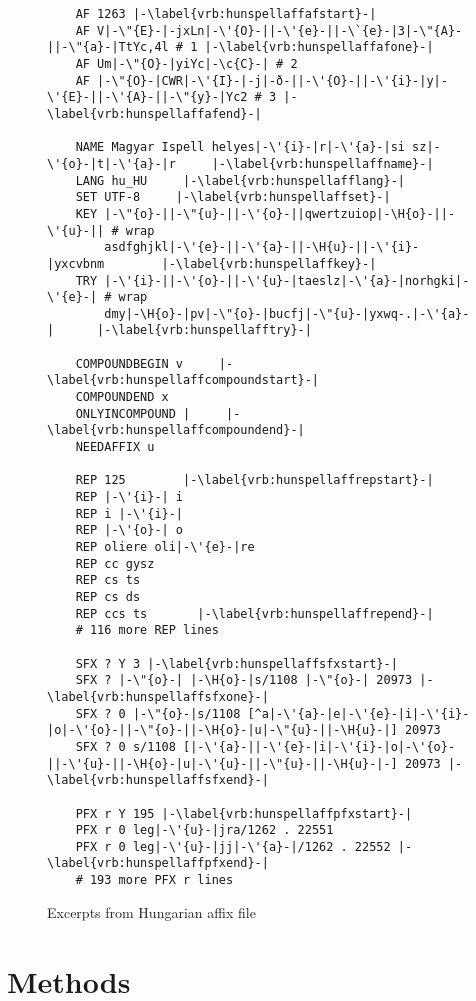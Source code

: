 \documentclass[postprint]{flammie}
\begin{document}
\begin{figure}[tbp]
  \centering
  \begin{lstlisting}
    AF 1263 |-\label{vrb:hunspellaffafstart}-|
    AF V|-\"{E}-|-jxLn|-\'{O}-||-\'{e}-||-\`{e}-|3|-\"{A}-||-\"{a}-|TtYc,4l # 1 |-\label{vrb:hunspellaffafone}-|
    AF Um|-\"{O}-|yiYc|-\c{C}-| # 2
    AF |-\"{O}-|CWR|-\'{I}-|-j|-ð-||-\'{O}-||-\'{i}-|y|-\'{E}-||-\'{A}-||-\"{y}-|Yc2 # 3 |-\label{vrb:hunspellaffafend}-|

    NAME Magyar Ispell helyes|-\'{i}-|r|-\'{a}-|si sz|-\'{o}-|t|-\'{a}-|r     |-\label{vrb:hunspellaffname}-|
    LANG hu_HU     |-\label{vrb:hunspellafflang}-|
    SET UTF-8     |-\label{vrb:hunspellaffset}-|
    KEY |-\"{o}-||-\"{u}-||-\'{o}-||qwertzuiop|-\H{o}-||-\'{u}-|| # wrap
        asdfghjkl|-\'{e}-||-\'{a}-||-\H{u}-||-\'{i}-|yxcvbnm        |-\label{vrb:hunspellaffkey}-|
    TRY |-\'{i}-||-\'{o}-||-\'{u}-|taeslz|-\'{a}-|norhgki|-\'{e}-| # wrap
        dmy|-\H{o}-|pv|-\"{o}-|bucfj|-\"{u}-|yxwq-.|-\'{a}-|      |-\label{vrb:hunspellafftry}-|
    
    COMPOUNDBEGIN v     |-\label{vrb:hunspellaffcompoundstart}-|
    COMPOUNDEND x     
    ONLYINCOMPOUND |     |-\label{vrb:hunspellaffcompoundend}-|
    NEEDAFFIX u     
    
    REP 125        |-\label{vrb:hunspellaffrepstart}-|
    REP |-\'{i}-| i       
    REP i |-\'{i}-|       
    REP |-\'{o}-| o       
    REP oliere oli|-\'{e}-|re
    REP cc gysz       
    REP cs ts       
    REP cs ds       
    REP ccs ts       |-\label{vrb:hunspellaffrepend}-|
    # 116 more REP lines
    
    SFX ? Y 3 |-\label{vrb:hunspellaffsfxstart}-|
    SFX ? |-\"{o}-| |-\H{o}-|s/1108 |-\"{o}-| 20973 |-\label{vrb:hunspellaffsfxone}-|
    SFX ? 0 |-\"{o}-|s/1108 [^a|-\'{a}-|e|-\'{e}-|i|-\'{i}-|o|-\'{o}-||-\"{o}-||-\H{o}-|u|-\"{u}-||-\H{u}-|] 20973
    SFX ? 0 s/1108 [|-\'{a}-||-\'{e}-|i|-\'{i}-|o|-\'{o}-||-\'{u}-||-\H{o}-|u|-\'{u}-||-\"{u}-||-\H{u}-|-] 20973 |-\label{vrb:hunspellaffsfxend}-|
    
    PFX r Y 195 |-\label{vrb:hunspellaffpfxstart}-|
    PFX r 0 leg|-\'{u}-|jra/1262 . 22551
    PFX r 0 leg|-\'{u}-|jj|-\'{a}-|/1262 . 22552 |-\label{vrb:hunspellaffpfxend}-|
    # 193 more PFX r lines
  \end{lstlisting}
  \caption{Excerpts from Hungarian affix file}
  \label{fig:hunspell-aff-examples}
\end{figure}

\section{Methods}
\label{sec:methods}
\end{document}
